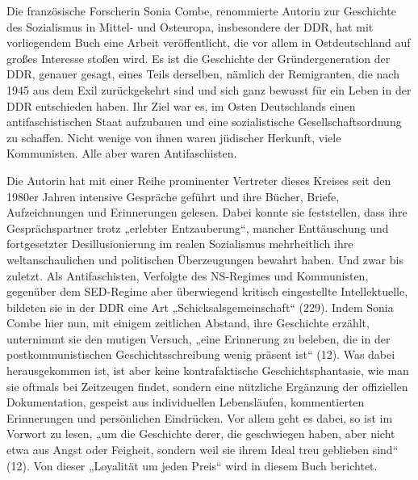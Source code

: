 \begin{multicols*}{2}
    
    \noindent Die französische Forscherin Sonia Combe, renommierte Autorin zur Geschichte des Sozialismus in Mittel- und Osteuropa, insbesondere der DDR, hat mit vorliegendem Buch eine Arbeit veröffentlicht, die vor allem in Ostdeutschland auf großes Interesse stoßen wird. Es ist die Geschichte der Gründergeneration der DDR, genauer gesagt, eines Teils derselben, nämlich der Remigranten, die nach 1945 aus dem Exil zurückgekehrt sind und sich ganz bewusst für ein Leben in der DDR entschieden haben. Ihr Ziel war es, im Osten Deutschlands einen antifaschistischen Staat aufzubauen und eine sozialistische Gesellschaftsordnung zu schaffen. Nicht wenige von ihnen waren jüdischer Herkunft, viele Kommunisten. Alle aber waren Antifaschisten. 

    Die Autorin hat mit einer Reihe prominenter Vertreter dieses Kreises seit den 1980er Jahren intensive Gespräche geführt und ihre Bücher, Briefe, Aufzeichnungen und Erinnerungen gelesen. Dabei konnte sie feststellen, dass ihre Gesprächspartner trotz „erlebter Entzauberung“, mancher Enttäuschung und fortgesetzter Desillusionierung im realen Sozialismus mehrheitlich ihre weltanschaulichen und politischen Überzeugungen bewahrt haben. Und zwar bis zuletzt. Als Antifaschisten, Verfolgte des NS-Regimes und Kommunisten, gegenüber dem SED-Regime aber überwiegend kritisch eingestellte Intellektuelle, bildeten sie in der DDR eine Art „Schicksalsgemeinschaft“ (229). Indem Sonia Combe hier nun, mit einigem zeitlichen Abstand, ihre Geschichte erzählt, unternimmt sie den mutigen Versuch, „eine Erinnerung zu beleben, die in der postkommunistischen Geschichtsschreibung wenig präsent ist“ (12). Was dabei herausgekommen ist, ist aber keine kontrafaktische Geschichtsphantasie, wie man sie oftmals bei Zeitzeugen findet, sondern eine nützliche Ergänzung der offiziellen Dokumentation, gespeist aus individuellen Lebensläufen, kommentierten Erinnerungen und persönlichen Eindrücken. Vor allem geht es dabei, so ist im Vorwort zu lesen, „um die Geschichte derer, die geschwiegen haben, aber nicht etwa aus Angst oder Feigheit, sondern weil sie ihrem Ideal treu geblieben sind“ (12). Von dieser „Loyalität um jeden Preis“ wird in diesem Buch berichtet. 


\end{multicols*}
